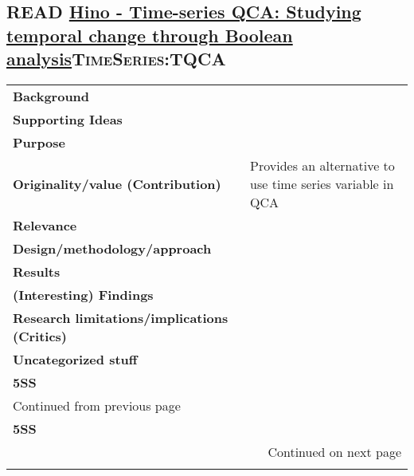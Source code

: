 \documentclass[11pt]{article}
\begin{document}
\subsection*{{\bfseries\sffamily READ} \href{https://waseda.pure.elsevier.com/en/publications/time-series-qca-studying-temporal-change-through-boolean-analysis}{Hino -  Time-series QCA: Studying temporal change through Boolean analysis}\hfill{}\textsc{TimeSeries:TQCA}}
\label{sec:org76ae119}
\begin{longtable}{l|p{}}
\hline
\hline
\textbf{Background} & \\
\textbf{Supporting Ideas} & \\
\textbf{Purpose} & \\
\textbf{Originality/value (Contribution)} & Provides an alternative to use time series variable in QCA\\
\textbf{Relevance} & \\
\textbf{Design/methodology/approach} & \\
\textbf{Results} & \\
\textbf{(Interesting) Findings} & \\
\textbf{Research limitations/implications (Critics)} & \\
\textbf{Uncategorized stuff} & \\
\textbf{5SS} & \\
\hline
\endfirsthead
\multicolumn{2}{l}{Continued from previous page} \\

\textbf{5SS} &  \\

\hline
\endhead
\hline\multicolumn{2}{r}{Continued on next page} \\
\endfoot
\endlastfoot
\hline
\hline
\end{longtable}
\end{document}
